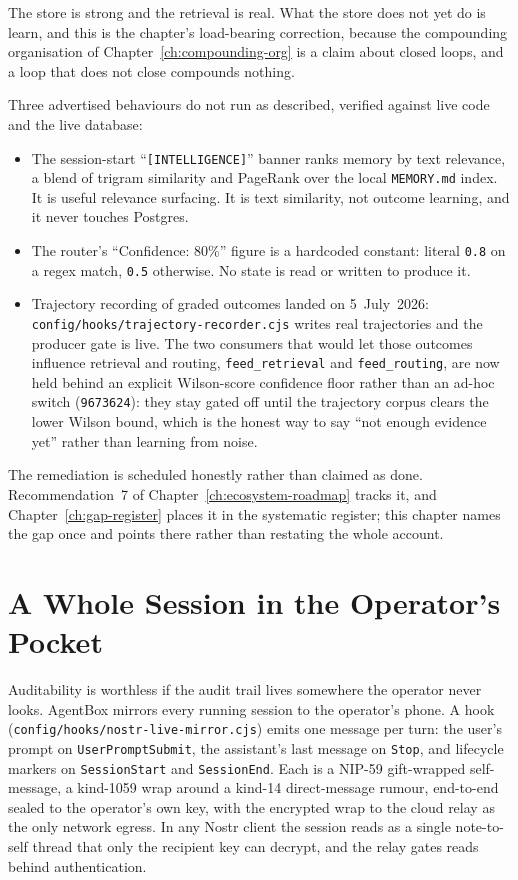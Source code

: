 The store is strong and the retrieval is real. What the store does not yet do is learn, and this is the chapter's load-bearing correction, because the
compounding organisation of Chapter~\ref{ch:compounding-org} is a claim about closed loops, and a loop that does not close compounds nothing.

\begin{cautionbox}[title={What the memory system does not do yet}]
Three advertised behaviours do not run as described, verified against live code and the live database:
\begin{itemize}
  \item The session-start ``\texttt{[INTELLIGENCE]}'' banner ranks memory by text relevance,
a blend of trigram similarity and PageRank over the local \texttt{MEMORY.md} index. It is useful relevance surfacing. It is text similarity, not outcome
learning, and it never touches Postgres.
  \item The router's ``Confidence: 80\%'' figure is a hardcoded constant:
literal \texttt{0.8} on a regex match, \texttt{0.5} otherwise. No state is read or written to produce it.
  \item Trajectory recording of graded outcomes landed on 5~July~2026:
\texttt{config/hooks/trajectory-recorder.cjs} writes real trajectories and the producer gate is live. The two consumers that would let those outcomes influence
retrieval and routing, \texttt{feed\_retrieval} and \texttt{feed\_routing}, are now held behind an explicit Wilson-score confidence floor rather than an ad-hoc
switch (\texttt{9673624}): they stay gated off until the trajectory corpus clears the lower Wilson bound, which is the honest way to say ``not enough evidence
yet'' rather than learning from noise.
\end{itemize}
The remediation is scheduled honestly rather than claimed as done. Recommendation~7 of Chapter~\ref{ch:ecosystem-roadmap} tracks it, and
Chapter~\ref{ch:gap-register} places it in the systematic register; this chapter names the gap once and points there rather than restating the whole account.
\end{cautionbox}

\section{A Whole Session in the Operator's Pocket}

Auditability is worthless if the audit trail lives somewhere the operator never looks. AgentBox mirrors every running session to the operator's phone. A hook
(\texttt{config/hooks/nostr-live-mirror.cjs}) emits one message per turn: the user's prompt on \texttt{UserPromptSubmit}, the assistant's last message on
\texttt{Stop}, and lifecycle markers on \texttt{SessionStart} and \texttt{SessionEnd}. Each is a NIP-59 gift-wrapped self-message, a kind-1059 wrap around a
kind-14 direct-message rumour, end-to-end sealed to the operator's own key, with the encrypted wrap to the cloud relay as the only network egress. In any Nostr
client the session reads as a single note-to-self thread that only the recipient key can decrypt, and the relay gates reads behind authentication.

